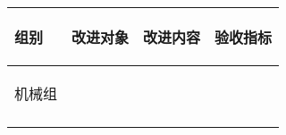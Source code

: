
\begin{longtable}{ p{1.5cm} | p{3cm} | p{6cm} | p{4.3cm} |}

    \hline

    \endfoot
    
    \rowcolor{tabhdcolor}

        \begin{center}
            组别
        \end{center} &
        \begin{center}
            改进对象
        \end{center} &
        \begin{center}
            改进内容
        \end{center} &
        \begin{center}
            验收指标
        \end{center}\\

    \hline

    \endhead

        \begin{center}
            机械组
        \end{center} &
        \begin{center}
            
        \end{center} &
        \begin{center}
            
        \end{center} &
        \begin{center}
            
        \end{center}\\
        
    \hline
        \begin{center}
            
        \end{center}&
        \begin{center}
            

\end{center}
\end{longtable}

